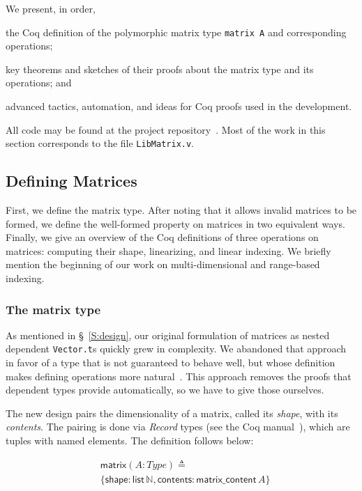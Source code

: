 \documentclass[11pt,conference]{IEEEtran}
\newcommand{\var}[1]{\mathit{#1}}
\newcommand{\func}[1]{\mathsf{#1}}
\theoremstyle{plain} %
\theoremstyle{definition}
\theoremstyle{remark}
\begin{document}
We present, in order,
\begin{inlist}
\item the Coq definition of the polymorphic matrix type \texttt{matrix A} and
    corresponding operations;
\item key theorems and sketches of their proofs about the matrix type and its
    operations; and
\item advanced tactics, automation, and ideas for Coq proofs used in the
    development.
\end{inlist}


All code may be found at the project repository~\cite{zelda_mosaic_proof}. Most
of the work in this section corresponds to the file \texttt{LibMatrix.v}.

\subsection{Defining Matrices}\label{S:matrix_defn}

First, we define the matrix type. After noting that it allows invalid matrices
to be formed, we define the well-formed property on matrices in two equivalent
ways. Finally, we give an overview of the Coq definitions of three operations on
matrices: computing their shape, linearizing, and linear indexing. We briefly
mention the beginning of our work on multi-dimensional and range-based indexing.

\subsubsection{The matrix type}

As mentioned in \S~\ref{S:design}, our original formulation of matrices as
nested dependent \texttt{Vector.t}s quickly grew in complexity. We abandoned
that approach in favor of a type that is not guaranteed to behave well, but
whose definition makes defining operations more natural~\cite{SO_2021_2}. This
approach removes the proofs that dependent types provide automatically, so we
have to give those ourselves.

The new design pairs the dimensionality of a matrix, called its \emph{shape},
with its \emph{contents}. The pairing is done via \emph{Record} types (see the
Coq manual~\cite{Coq}), which are tuples with named elements. The definition
follows below:

\begin{align*}
    & \func{matrix} (\var{A}: \var{Type}) \triangleq \\
    & \{
        \func{shape}: \func{list}\, \mathbb{N},
        \func{contents}: \func{matrix\_content}\, \var{A}
    \}
\end{align*}
\end{document}
